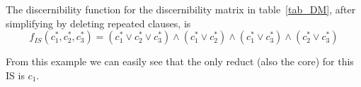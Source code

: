 \documentclass[authoryear,11pt]{elsarticle}
\begin{document}
  The discernibility function for the discernibility matrix in table~\ref{tab_DM}, after simplifying by 
  deleting repeated clauses, is  
  $$f_{IS}(c_1^*,c_2^*,c_3^*)=(c_1^* \vee c_2^* \vee c_3^*) \wedge (c_1^* \vee c_2^*) 
   \wedge (c_1^* \vee c_3^*) \wedge (c_2^* \vee c_3^*) $$
  
  From this example we can easily see that the only reduct (also the core) for this IS is $c_1$.
  
%  
%    
%  
%  
%  
%  
%  
%  
\end{document}
